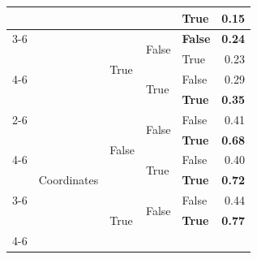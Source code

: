 \documentclass{article}
\begin{document}
\begin{table}
\begin{center}
{\begin{tabular}{@{}lllllr@{}}
                                                        &                                   &                           &                           & True                  & 0.15 \\
    \cmidrule{3-6}
                                                        &                                   & \multirow[c]{4}{*}{True}  & \multirow[c]{2}{*}{False} & \textbf{False}        & \textbf{0.24} \\
                                                        &                                   &                           &                           & True                  & 0.23 \\
    \cmidrule{4-6}
                                                        &                                   &                           & \multirow[c]{2}{*}{True}  & False                 & 0.29 \\
                                                        &                                   &                           &                           & \textbf{True}         & \textbf{0.35} \\
    \cmidrule{2-6}
                                                        & \multirow[c]{9}{*}{Coordinates}   & \multirow[c]{4}{*}{False} & \multirow[c]{2}{*}{False} & False                 & 0.41 \\
                                                        &                                   &                           &                           & \textbf{True}         & \textbf{0.68} \\
    \cmidrule{4-6}
                                                        &                                   &                           & \multirow[c]{2}{*}{True}  & False                 & 0.40 \\
                                                        &                                   &                           &                           & \textbf{True}         & \textbf{0.72} \\
    \cmidrule{3-6}
                                                        &                                   & \multirow[c]{4}{*}{True}  & \multirow[c]{2}{*}{False} & False                 & 0.44 \\
                                                        &                                   &                           &                           & \textbf{True}         & \textbf{0.77} \\
    \cmidrule{4-6}

\end{tabular}}
\end{center}
\end{table}
\end{document}

